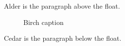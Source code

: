 \documentclass{article}
\begin{document}
Alder is the paragraph above the float.

\begin{figure}[h]
\centering
{}
\caption{Birch caption}
\end{figure}

Cedar is the paragraph below the float.
\end{document}
